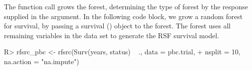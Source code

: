 \documentclass[nojss]{jss}
\begin{document}
The   function call grows the forest, determining the type of forest by the response supplied in the  argument. In the following code block, we grow a random forest for survival, by passing a survival () object to the forest. The forest uses all remaining variables in the  data set to generate the RSF survival model.

\begin{Schunk}
\begin{Sinput}
R> rfsrc_pbc <- rfsrc(Surv(years, status) ~ ., data = pbc.trial,
+                    nsplit = 10, na.action = "na.impute")
\end{Sinput}
\end{Schunk}
\end{document}
